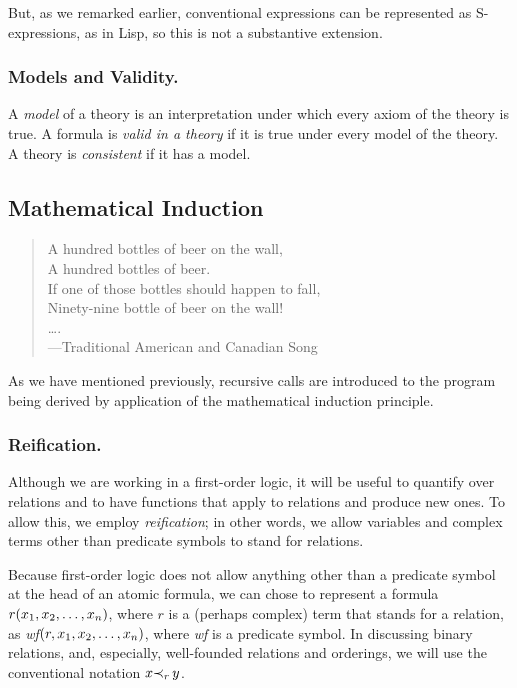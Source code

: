 \documentclass[runningheads]{llncs}
\begin{document}
     But, as we remarked earlier,  conventional expressions can be represented as S-expressions, as in Lisp, so this is not a substantive extension.
    
    
 
 
   
   \subsubsection{Models and Validity.} A \emph{model} of a theory is an interpretation under which every axiom of the theory is true. A formula is \emph{valid in a theory} if it is true under every model of the theory. A theory is \emph{consistent} if it has a model.

   
 \subsection{Mathematical Induction}
 \begin{quote}
 A hundred bottles of beer on the wall, \\
 A hundred bottles of beer. \\
 If one of those bottles should happen to fall, \\
 Ninety-nine bottle of beer on the wall! \\
 \ldots .
 \\---Traditional American and Canadian Song
 \end{quote}
   
 As we have mentioned previously, recursive calls are introduced to the program being derived by application of the mathematical induction principle.  
 
 \subsubsection{Reification.} Although we are working in a first-order logic, it will be useful to quantify over relations and to have functions that apply to relations and produce new ones.  To allow this, we employ \emph{reification};
 in other words,  we allow variables and complex terms other than predicate symbols to stand for relations.
 \begin{comment}
 If $r$ is a term that  stands for a relation, recall that we regard 
$r(\var{x}, \var{y})$ as a notation for the symbolic expression 
$(r \cons (\var{x} \cons(\var{y} \cons \nil))$. If $r$ is a variable, we can quantify over it just like any other variable. 
\end{comment}
Because first-order logic does not allow anything other than a predicate symbol at the head of an atomic formula, we can chose to represent a formula ${r}(x_{1}, x_{2}, \ldots, x_{n})$, where ${r}$ is a (perhaps complex) term that stands for a relation, as 
\emph{wf}\!$(r, x_{1}, x_{2}, \ldots, x_{n})$, where   \emph{wf} is a predicate symbol. In discussing binary relations, and, especially, well-founded relations and orderings, we will use the conventional notation $x {\prec}_{r}\, y$.
\end{document}
